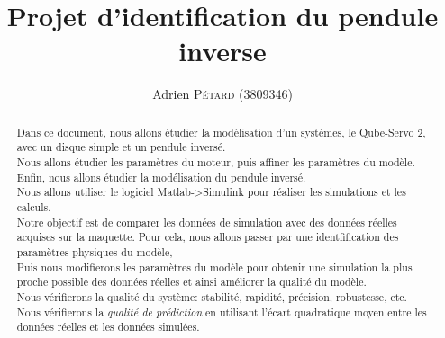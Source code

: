 
\usepackage{cite}
\usepackage{amsmath,amssymb,amsfonts}
\usepackage[english]{babel}
\usepackage{algorithmic}
\usepackage{graphicx}
\usepackage{textcomp}
\usepackage{xcolor}





\title{Projet d'identification du pendule inverse
}


\author{Adrien \textsc{Pétard} (3809346)}





\maketitle

\begin{abstract}
    Dans ce document, nous allons étudier la modélisation d'un systèmes, le Qube-Servo 2, avec un disque simple et un pendule inversé. \\
    Nous allons étudier les paramètres du moteur, puis affiner les paramètres du modèle. Enfin, nous allons étudier la modélisation du pendule inversé.\\
    Nous allons utiliser le logiciel Matlab->Simulink pour réaliser les simulations et les calculs.\\
    Notre objectif est de comparer les données de simulation avec des données réelles acquises sur la maquette.
    Pour cela, nous allons passer par une identfification des paramètres physiques du modèle, \\
    Puis nous modifierons les paramètres du modèle pour obtenir une simulation la plus proche possible des données réelles et ainsi améliorer la qualité du modèle.\\
    Nous vérifierons la qualité du système: stabilité, rapidité, précision, robustesse, etc.\\
    Nous vérifierons la \textit{qualité de prédiction} en utilisant l'écart quadratique moyen entre les données réelles et les données simulées.




\end{abstract}

